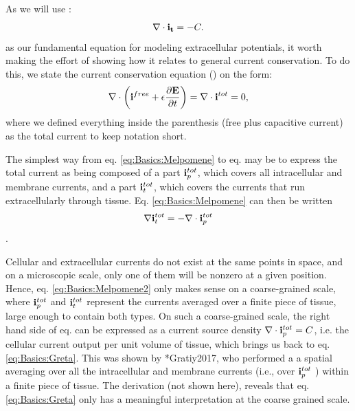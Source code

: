 \subsection{ }
As we will use :
\begin{equation}
{\bf \nabla} \cdot {\bf i_t} = -C.
\label{eq:Basics:Greta}
\end{equation}
as our fundamental equation for modeling extracellular potentials, it worth making the effort of showing how it relates to general current conservation. To do this, we state the current conservation equation () on the form:
\begin{equation}
{\bf \nabla} \cdot \left( {\bf i}^{free} +  \epsilon \frac{\partial {\bf E}}{\partial t} \right) = {\bf \nabla} \cdot {\bf i}^{tot}  = 0, 
\label{eq:Basics:Melpomene}
\end{equation}
where we defined everything inside the parenthesis (free plus capacitive current) as the total current to keep notation short. 

The simplest way from eq. \ref{eq:Basics:Melpomene} to eq. \label{eq:Basics:Greta} may be to express the total current as being composed of a part ${\bf i}^{tot}_p$, which covers all intracellular and membrane currents, and a part ${\bf i}^{tot}_t$, which covers the currents that run extracellularly through tissue. Eq. \ref{eq:Basics:Melpomene} can then be written
\begin{equation}
{\bf \nabla} {\bf i}^{tot}_t = - {\bf \nabla} \cdot {\bf i}^{tot}_p
\label{eq:Basics:Melpomene2}
\end{equation}.

Cellular and extracellular currents do not exist at the same points in space, and on a microscopic scale,  only one of them will be nonzero at a given position. Hence, eq. \ref{eq:Basics:Melpomene2} only makes sense on a coarse-grained scale, where ${\bf i}^{tot}_p$ and ${\bf i}^{tot}_t$ represent the currents averaged over a finite piece of tissue, large enough to contain both types. On such a coarse-grained scale, the right hand side of eq. \label{eq:Basics:Melpomene2} can be expressed as a current source density ${\bf \nabla} \cdot {\bf i}^{tot}_p = C$, i.e. the cellular current output per unit volume of tissue, which brings us back to eq. \ref{eq:Basics:Greta}. This was shown by \citeasnoun**{Gratiy2017}, who performed a a spatial averaging over all the intracellular and membrane currents (i.e., over ${\bf i}^{tot}_p$ ) within a finite piece of tissue. The derivation (not shown here), reveals that eq. \ref{eq:Basics:Greta} only has a meaningful interpretation at the coarse grained scale.

